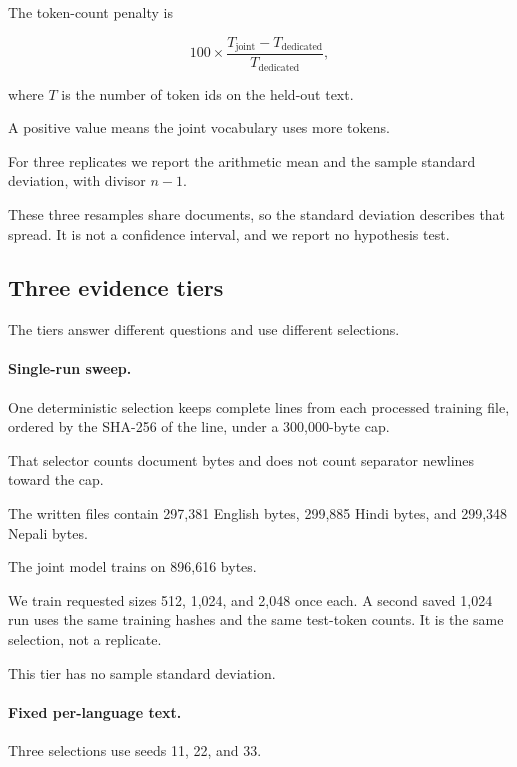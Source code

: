 \documentclass[10pt,twocolumn]{article}
\begin{document}
The token-count penalty is

\begin{equation}
100 \times
\frac{T_{\text{joint}}-T_{\text{dedicated}}}
{T_{\text{dedicated}}},
\label{eq:penalty}
\end{equation}

where $T$ is the number of token ids on the held-out text.

A positive value means the joint vocabulary uses more
tokens.

For three replicates we report the arithmetic mean and
the sample standard deviation, with divisor $n-1$.

These three resamples share documents, so the standard
deviation describes that spread. It is not a confidence
interval, and we report no hypothesis test.

\subsection{Three evidence tiers}

The tiers answer different questions and use different
selections.

\paragraph{Single-run sweep.}

One deterministic selection keeps complete lines from
each processed training file, ordered by the SHA-256
of the line, under a 300,000-byte cap.

That selector counts document bytes and does not count
separator newlines toward the cap.

The written files contain 297,381 English bytes,
299,885 Hindi bytes, and 299,348 Nepali bytes.

The joint model trains on 896,616 bytes.

We train requested sizes 512, 1,024, and 2,048 once
each. A second saved 1,024 run uses the same training
hashes and the same test-token counts. It is the same
selection, not a replicate.

This tier has no sample standard deviation.

\paragraph{Fixed per-language text.}

Three selections use seeds 11, 22, and 33.
\end{document}
